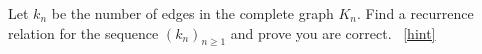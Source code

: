 \documentclass{book}
\begin{document}
\setcounter{project}{135}
\addtocounter{project}{-1}
\begin{activity}[]\label{activity-128}
\hypertarget{p-946}{}%
Let \(k_n\) be the number of edges in the complete graph \(K_n\).  Find a recurrence relation for the sequence \((k_n)_{n \ge 1}\) and prove you are correct.%
~\hfill{\tiny\hyperlink{a-135}{[hint]}\hypertarget{q-135}{}}\end{activity}
\end{document}
